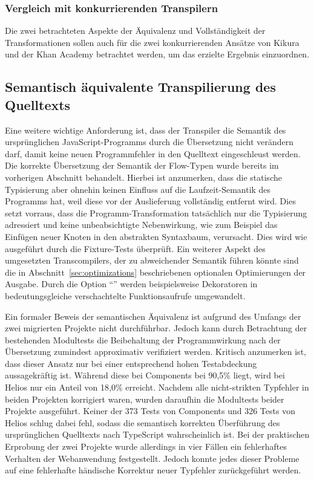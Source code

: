 
\subsubsection{Vergleich mit konkurrierenden Transpilern}

Die zwei betrachteten Aspekte der Äquivalenz und Vollständigkeit der Transformationen sollen auch für die zwei konkurrierenden Ansätze von Kikura und der Khan Academy betrachtet werden, um das erzielte Ergebnis einzuordnen.



\subsection{Semantisch äquivalente Transpilierung des Quelltexts}

Eine weitere wichtige Anforderung ist, dass der Transpiler die Semantik des ursprünglichen JavaScript-Programms durch die Übersetzung nicht verändern darf, damit keine neuen Programmfehler in den Quelltext eingeschleust werden. Die korrekte Übersetzung der Semantik der Flow-Typen wurde bereits im vorherigen Abschnitt behandelt. Hierbei ist anzumerken, dass die statische Typisierung aber ohnehin keinen Einfluss auf die Laufzeit-Semantik des Programms hat, weil diese vor der Auslieferung vollständig entfernt wird. Dies setzt vorraus, dass die Programm-Transformation tatsächlich nur die Typisierung adressiert und keine unbeabsichtigte Nebenwirkung, wie zum Beispiel das Einfügen neuer Knoten in den abstrakten Syntaxbaum, verursacht. Dies wird wie ausgeführt durch die Fixture-Tests überprüft. Ein weiterer Aspekt des umgesetzten Transcompilers, der zu abweichender Semantik führen könnte sind die in Abschnitt~\ref{sec:optimizations} beschriebenen optionalen Optimierungen der Ausgabe. Durch die Option \enquote{} werden beispielsweise Dekoratoren in bedeutungsgleiche verschachtelte Funktionsaufrufe umgewandelt.

Ein formaler Beweis der semantischen Äquivalenz ist aufgrund des Umfangs der zwei migrierten Projekte nicht durchführbar. Jedoch kann durch Betrachtung der bestehenden Modultests die Beibehaltung der Programmwirkung nach der Übersetzung zumindest approximativ verifiziert werden. Kritisch anzumerken ist, dass dieser Ansatz nur bei einer entsprechend hohen Testabdeckung aussagekräftig ist. Während diese bei Components bei 90,5\% liegt, wird bei Helios nur ein Anteil von 18,0\% erreicht. Nachdem alle nicht-strikten Typfehler in beiden Projekten korrigiert waren, wurden daraufhin die Modultests beider Projekte ausgeführt. Keiner der 373 Tests von Components und 326 Tests von Helios schlug dabei fehl, sodass die semantisch korrekten Überführung des ursprünglichen Quelltexts nach TypeScript wahrscheinlich ist.
Bei der praktischen Erprobung der zwei Projekte wurde allerdings in vier Fällen ein fehlerhaftes Verhalten der Webanwendung festgestellt. Jedoch konnte jedes dieser Probleme auf eine fehlerhafte händische Korrektur neuer Typfehler zurückgeführt werden.


